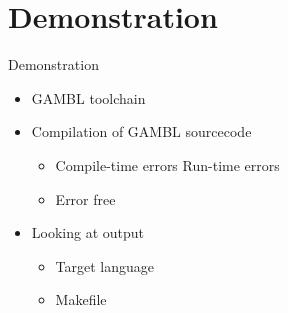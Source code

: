 \section{Demonstration} %
\label{sec:demonstration}
\begin{frame}{Demonstration}
    \begin{itemize}
        \item GAMBL toolchain
        \item Compilation of GAMBL sourcecode
        \begin{itemize}
            \item Compile-time errors
            \time Run-time errors
            \item Error free
        \end{itemize}
        \item Looking at output
        \begin{itemize}
            \item Target language
            \item Makefile
        \end{itemize}
    \end{itemize}
\end{frame}

